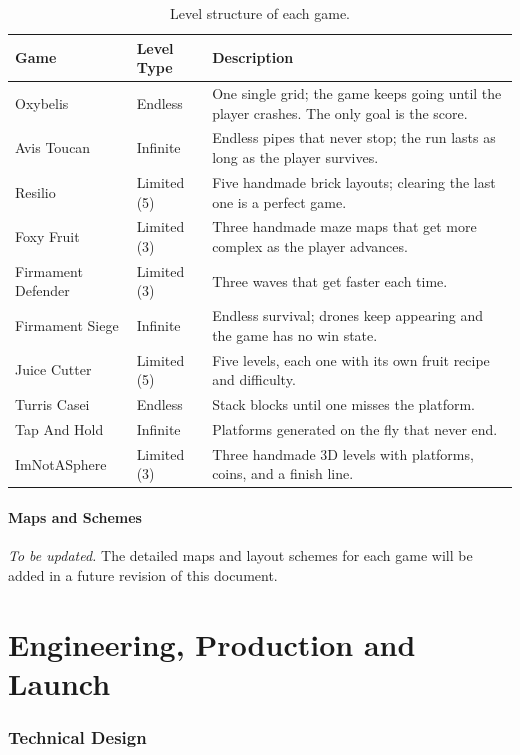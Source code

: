 \documentclass[12pt,letterpaper]{article}
\begin{document}
\begin{table}[H]
\centering
\footnotesize
\begin{tabular}{|p{3.2cm}|p{3.2cm}|p{8.5cm}|}
\hline
\textbf{Game} & \textbf{Level Type} & \textbf{Description} \\
\hline
Oxybelis & Endless & One single grid; the game keeps going until the player crashes. The only goal is the score. \\
\hline
Avis Toucan & Infinite & Endless pipes that never stop; the run lasts as long as the player survives. \\
\hline
Resilio & Limited (5) & Five handmade brick layouts; clearing the last one is a perfect game. \\
\hline
Foxy Fruit & Limited (3) & Three handmade maze maps that get more complex as the player advances. \\
\hline
Firmament Defender & Limited (3) & Three waves that get faster each time. \\
\hline
Firmament Siege & Infinite & Endless survival; drones keep appearing and the game has no win state. \\
\hline
Juice Cutter & Limited (5) & Five levels, each one with its own fruit recipe and difficulty. \\
\hline
Turris Casei & Endless & Stack blocks until one misses the platform. \\
\hline
Tap And Hold & Infinite & Platforms generated on the fly that never end. \\
\hline
ImNotASphere & Limited (3) & Three handmade 3D levels with platforms, coins, and a finish line. \\
\hline
\end{tabular}
\caption{Level structure of each game.}
\end{table}

\subsection{Maps and Schemes}

\textit{To be updated.} The detailed maps and layout schemes for each game will be added in a future revision of this document.

\part{Engineering, Production and Launch}

\section{Technical Design}
\end{document}
